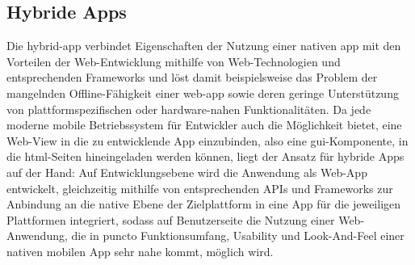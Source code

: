 \subsection{Hybride Apps} \label{hybrid-app}

Die \gls{hybrid-app} verbindet Eigenschaften der Nutzung einer nativen \gls{app} mit den Vorteilen der Web-Entwicklung mithilfe von Web-Technologien und entsprechenden Frameworks und löst damit beispielsweise das Problem der mangelnden Offline-Fähigkeit einer \gls{web-app} sowie deren geringe Unterstützung von plattformspezifischen oder hardware-nahen Funktionalitäten. 
Da jede moderne mobile Betriebssystem für Entwickler auch die Möglichkeit bietet, eine Web-View in die zu entwicklende App einzubinden, also eine \gls{gui}-Komponente, in die \gls{html}-Seiten hineingeladen werden können, liegt der Ansatz für hybride Apps auf der Hand: Auf Entwicklungsebene wird die Anwendung als Web-App entwickelt, gleichzeitig mithilfe von entsprechenden APIs und Frameworks zur Anbindung an die native Ebene der Zielplattform in eine App für die jeweiligen Plattformen integriert, sodass auf Benutzerseite die Nutzung einer Web-Anwendung, die in puncto Funktionsumfang, Usability und Look-And-Feel einer nativen mobilen App sehr nahe kommt, möglich wird.

